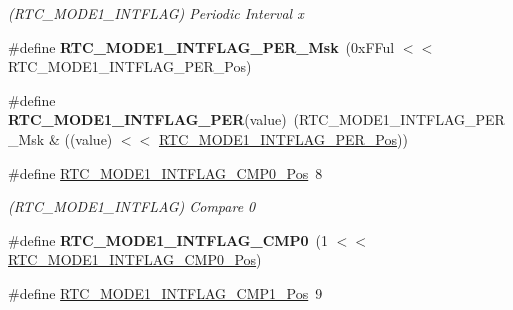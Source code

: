 \begin{DoxyCompactItemize}
\begin{DoxyCompactList}\small\item\em (R\+T\+C\+\_\+\+M\+O\+D\+E1\+\_\+\+I\+N\+T\+F\+L\+A\+G) Periodic Interval x \end{DoxyCompactList}\item 
\hypertarget{group___s_a_m_l21___r_t_c_ga8a6ad5e5027bae5abd89f0ed759279f1}{}\#define {\bfseries R\+T\+C\+\_\+\+M\+O\+D\+E1\+\_\+\+I\+N\+T\+F\+L\+A\+G\+\_\+\+P\+E\+R\+\_\+\+Msk}~(0x\+F\+Ful $<$$<$ R\+T\+C\+\_\+\+M\+O\+D\+E1\+\_\+\+I\+N\+T\+F\+L\+A\+G\+\_\+\+P\+E\+R\+\_\+\+Pos)\label{group___s_a_m_l21___r_t_c_ga8a6ad5e5027bae5abd89f0ed759279f1}

\item 
\hypertarget{group___s_a_m_l21___r_t_c_gab58a688799c08f143d531c715e8f966e}{}\#define {\bfseries R\+T\+C\+\_\+\+M\+O\+D\+E1\+\_\+\+I\+N\+T\+F\+L\+A\+G\+\_\+\+P\+E\+R}(value)~(R\+T\+C\+\_\+\+M\+O\+D\+E1\+\_\+\+I\+N\+T\+F\+L\+A\+G\+\_\+\+P\+E\+R\+\_\+\+Msk \& ((value) $<$$<$ \hyperlink{group___s_a_m_l21___r_t_c_ga1d303f970e990fbd2e3515ca1cf358ca}{R\+T\+C\+\_\+\+M\+O\+D\+E1\+\_\+\+I\+N\+T\+F\+L\+A\+G\+\_\+\+P\+E\+R\+\_\+\+Pos}))\label{group___s_a_m_l21___r_t_c_gab58a688799c08f143d531c715e8f966e}

\item 
\hypertarget{group___s_a_m_l21___r_t_c_gaecd6c4aa4ecbf03cc90ffa0dac67ca94}{}\#define \hyperlink{group___s_a_m_l21___r_t_c_gaecd6c4aa4ecbf03cc90ffa0dac67ca94}{R\+T\+C\+\_\+\+M\+O\+D\+E1\+\_\+\+I\+N\+T\+F\+L\+A\+G\+\_\+\+C\+M\+P0\+\_\+\+Pos}~8\label{group___s_a_m_l21___r_t_c_gaecd6c4aa4ecbf03cc90ffa0dac67ca94}

\begin{DoxyCompactList}\small\item\em (R\+T\+C\+\_\+\+M\+O\+D\+E1\+\_\+\+I\+N\+T\+F\+L\+A\+G) Compare 0 \end{DoxyCompactList}\item 
\hypertarget{group___s_a_m_l21___r_t_c_ga8cf0dd563a58f3fd832b42f3ef5ea21b}{}\#define {\bfseries R\+T\+C\+\_\+\+M\+O\+D\+E1\+\_\+\+I\+N\+T\+F\+L\+A\+G\+\_\+\+C\+M\+P0}~(1 $<$$<$ \hyperlink{group___s_a_m_l21___r_t_c_gaecd6c4aa4ecbf03cc90ffa0dac67ca94}{R\+T\+C\+\_\+\+M\+O\+D\+E1\+\_\+\+I\+N\+T\+F\+L\+A\+G\+\_\+\+C\+M\+P0\+\_\+\+Pos})\label{group___s_a_m_l21___r_t_c_ga8cf0dd563a58f3fd832b42f3ef5ea21b}

\item 
\hypertarget{group___s_a_m_l21___r_t_c_gabce18af92ef48a448cc57542d013bb73}{}\#define \hyperlink{group___s_a_m_l21___r_t_c_gabce18af92ef48a448cc57542d013bb73}{R\+T\+C\+\_\+\+M\+O\+D\+E1\+\_\+\+I\+N\+T\+F\+L\+A\+G\+\_\+\+C\+M\+P1\+\_\+\+Pos}~9\label{group___s_a_m_l21___r_t_c_gabce18af92ef48a448cc57542d013bb73}


\end{DoxyCompactItemize}
